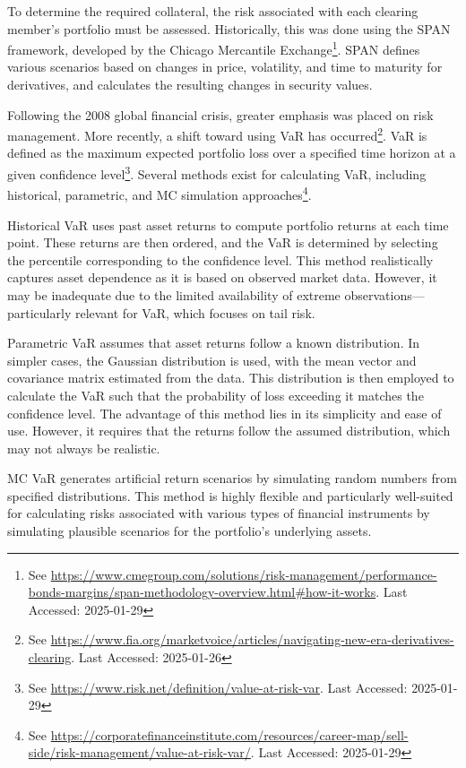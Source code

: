 To determine the required collateral, the risk associated with each clearing member's portfolio must be assessed. Historically, this was done using the \gls{SPAN} framework, developed by the Chicago Mercantile Exchange\footnote{See \url{https://www.cmegroup.com/solutions/risk-management/performance-bonds-margins/span-methodology-overview.html\#how-it-works}.  Last Accessed: 2025-01-29}. \gls{SPAN} defines various scenarios based on changes in price, volatility, and time to maturity for derivatives, and calculates the resulting changes in security values.

Following the 2008 global financial crisis, greater emphasis was placed on risk management. More recently, a shift toward using \gls{VaR} has occurred\footnote{See \url{https://www.fia.org/marketvoice/articles/navigating-new-era-derivatives-clearing}. Last Accessed: 2025-01-26}. \gls{VaR} is defined as the maximum expected portfolio loss over a specified time horizon at a given confidence level\footnote{See \url{https://www.risk.net/definition/value-at-risk-var}. Last Accessed: 2025-01-29}. Several methods exist for calculating \gls{VaR}, including historical, parametric, and \gls{MC} simulation approaches\footnote{See \url{https://corporatefinanceinstitute.com/resources/career-map/sell-side/risk-management/value-at-risk-var/}. Last Accessed: 2025-01-29}.  

Historical \gls{VaR} uses past asset returns to compute portfolio returns at each time point. These returns are then ordered, and the \gls{VaR} is determined by selecting the percentile corresponding to the confidence level. This method realistically captures asset dependence as it is based on observed market data\footnotemark[\value{footnote}]. However, it may be inadequate due to the limited availability of extreme observations—particularly relevant for \gls{VaR}, which focuses on tail risk.

Parametric \gls{VaR} assumes that asset returns follow a known distribution. In simpler cases, the Gaussian distribution is used, with the mean vector and covariance matrix estimated from the data. This distribution is then employed to calculate the \gls{VaR} such that the probability of loss exceeding it matches the confidence level\footnotemark[\value{footnote}]. The advantage of this method lies in its simplicity and ease of use. However, it requires that the returns follow the assumed distribution, which may not always be realistic.

\gls{MC} \gls{VaR} generates artificial return scenarios by simulating random numbers from specified distributions\footnotemark[\value{footnote}]. This method is highly flexible and particularly well-suited for calculating risks associated with various types of financial instruments by simulating plausible scenarios for the portfolio’s underlying assets.

